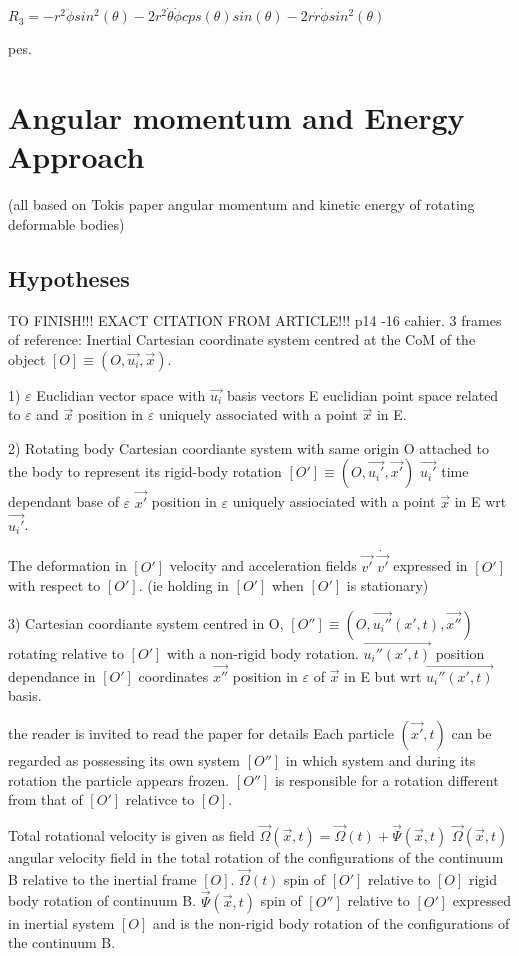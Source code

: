 $R_{3}=-r^2\ddot \phi sin^2(\theta)-2r^2\dot \theta \dot \phi cps(\theta)sin(\theta) -2r \dot r \dot \phi sin^2(\theta)$


 \glspl{pe}.

\section{Angular momentum and Energy Approach}
\label{Angular momentum and Energy Approach}
(all based on Tokis paper angular momentum and kinetic energy of rotating deformable bodies)
\subsection{Hypotheses}
TO FINISH!!!
EXACT CITATION FROM ARTICLE!!! p14 -16 cahier.
3 frames of reference:
Inertial Cartesian coordinate system centred at the CoM of the object $[O]\equiv (O, \vec{u_i}, \vec{x})$.

1) $\varepsilon$ Euclidian vector space with $\vec{u_i}$ basis vectors
E euclidian point space related to $\varepsilon$ and $\vec{x}$ position in $\varepsilon$ uniquely associated with a point $\vec{x}$ in E.

2) Rotating body Cartesian coordiante system with same origin O attached to the body to represent its rigid-body rotation $[O']\equiv (O, \vec{u_i'}, \vec{x'})$
$\vec{u_i'}$ time dependant base of $\varepsilon$
$\vec{x'}$ position in $\varepsilon$ uniquely assiociated with a point $\vec{x}$ in E wrt $\vec{u_i'}$.

The deformation in $[O']$ velocity and acceleration fields $\vec{v'}$ $\dot{\vec{v'}}$ expressed in $[O']$ with respect to $[O']$. (ie holding in $[O']$ when $[O']$ is stationary)

3) Cartesian coordiante system centred in O, $[O'']\equiv(O,\vec{u_i''}(x',t),\vec{x''})$ rotating relative to $[O']$ with a non-rigid body rotation. $\vec{u_i''(x',t)}$ position dependance in $[O']$ coordinates $\vec{x''}$ position in $\varepsilon$ of $\vec{x}$ in E but wrt $\vec{u_i''(x',t)}$ basis.

the reader is invited to read the paper for details
Each particle $(\vec{x'},t)$ can be regarded as possessing its own system $[O'']$ in which system and during its rotation the particle appears frozen. $[O'']$ is responsible for a rotation different from that of $[O']$ relativce to $[O]$.

Total rotational velocity is given as field $\vec{\Omega}(\vec{x},t)=\vec{\Omega}(t)+\vec{\Psi}(\vec{x},t)$
$\vec{\Omega}(\vec{x},t)$ angular velocity field in the total rotation of the configurations of the continuum B relative to the inertial frame $[O]$.
$\vec{\Omega}(t)$ spin of $[O']$ relative to $[O]$ rigid body rotation of continuum B.
$\vec{\Psi}(\vec{x},t)$ spin of $[O'']$ relative to $[O']$ expressed in inertial system $[O]$ and is the non-rigid body rotation of the configurations of the continuum B.
